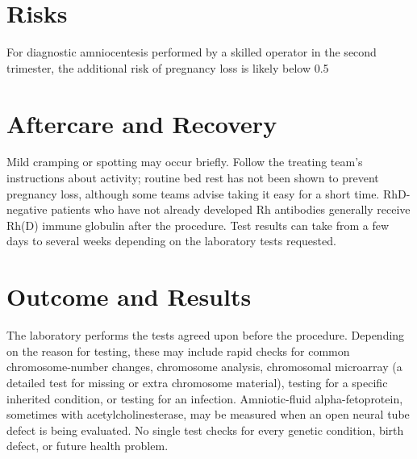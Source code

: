 \section*{Risks}
For diagnostic amniocentesis performed by a skilled operator in the second trimester, the additional risk of pregnancy loss is likely below 0.5%

\section*{Aftercare and Recovery}
Mild cramping or spotting may occur briefly. Follow the treating team's instructions about activity; routine bed rest has not been shown to prevent pregnancy loss, although some teams advise taking it easy for a short time. RhD-negative patients who have not already developed Rh antibodies generally receive Rh(D) immune globulin after the procedure. Test results can take from a few days to several weeks depending on the laboratory tests requested.

\section*{Outcome and Results}
The laboratory performs the tests agreed upon before the procedure. Depending on the reason for testing, these may include rapid checks for common chromosome-number changes, chromosome analysis, chromosomal microarray (a detailed test for missing or extra chromosome material), testing for a specific inherited condition, or testing for an infection. Amniotic-fluid alpha-fetoprotein, sometimes with acetylcholinesterase, may be measured when an open neural tube defect is being evaluated. No single test checks for every genetic condition, birth defect, or future health problem.

